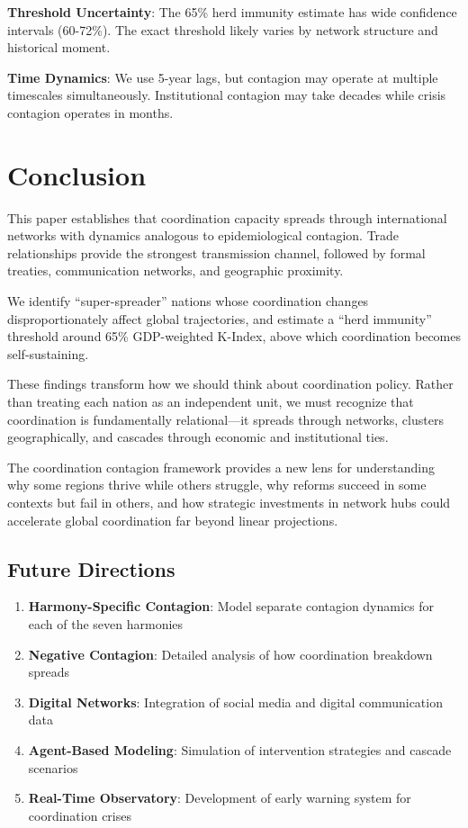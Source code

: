 \documentclass[12pt,a4paper]{article}
\begin{document}
\textbf{Threshold Uncertainty}: The 65\% herd immunity estimate has wide confidence intervals (60-72\%). The exact threshold likely varies by network structure and historical moment.

\textbf{Time Dynamics}: We use 5-year lags, but contagion may operate at multiple timescales simultaneously. Institutional contagion may take decades while crisis contagion operates in months.

\section{Conclusion}
\label{sec:conclusion}

This paper establishes that coordination capacity spreads through international networks with dynamics analogous to epidemiological contagion. Trade relationships provide the strongest transmission channel, followed by formal treaties, communication networks, and geographic proximity.

We identify ``super-spreader'' nations whose coordination changes disproportionately affect global trajectories, and estimate a ``herd immunity'' threshold around 65\% GDP-weighted K-Index, above which coordination becomes self-sustaining.

These findings transform how we should think about coordination policy. Rather than treating each nation as an independent unit, we must recognize that coordination is fundamentally relational---it spreads through networks, clusters geographically, and cascades through economic and institutional ties.

The coordination contagion framework provides a new lens for understanding why some regions thrive while others struggle, why reforms succeed in some contexts but fail in others, and how strategic investments in network hubs could accelerate global coordination far beyond linear projections.

\subsection{Future Directions}

\begin{enumerate}
    \item \textbf{Harmony-Specific Contagion}: Model separate contagion dynamics for each of the seven harmonies
    \item \textbf{Negative Contagion}: Detailed analysis of how coordination breakdown spreads
    \item \textbf{Digital Networks}: Integration of social media and digital communication data
    \item \textbf{Agent-Based Modeling}: Simulation of intervention strategies and cascade scenarios
    \item \textbf{Real-Time Observatory}: Development of early warning system for coordination crises
\end{enumerate}
\end{document}
